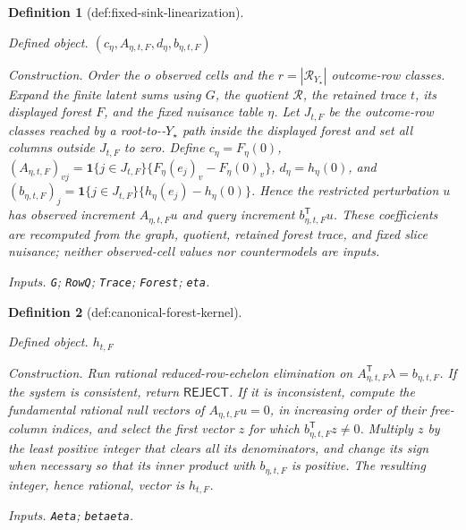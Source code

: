 \documentclass{article}
\newtheorem{definition}{Definition}
\begin{document}
\begin{definition}[def:fixed-sink-linearization]\label{def:fixed-sink-linearization}
\par\smallskip\noindent\emph{Defined object.} \((c_{\eta},A_{\eta,t,F},d_{\eta},b_{\eta,t,F})\)
\par\smallskip\noindent\emph{Construction.} Order the \(o\) observed cells and the \(r=|\mathcal R_{Y_{\star}}|\) outcome-row classes. Expand the finite latent sums using \(G\), the quotient \(\mathcal R\), the retained trace \(t\), its displayed forest \(F\), and the fixed nuisance table \(\eta\). Let \(J_{t,F}\) be the outcome-row classes reached by a root-to-‑\(Y_{\star}\) path inside the displayed forest and set all columns outside \(J_{t,F}\) to zero. Define \(c_{\eta}=F_{\eta}(0)\), \((A_{\eta,t,F})_{vj}=\mathbf 1\{j\in J_{t,F}\}\{F_{\eta}(e_j)_v-F_{\eta}(0)_v\}\), \(d_{\eta}=h_{\eta}(0)\), and \((b_{\eta,t,F})_j=\mathbf 1\{j\in J_{t,F}\}\{h_{\eta}(e_j)-h_{\eta}(0)\}\). Hence the restricted perturbation \(u\) has observed increment \(A_{\eta,t,F}u\) and query increment \(b_{\eta,t,F}^{\mathsf T}u\). These coefficients are recomputed from the graph, quotient, retained forest trace, and fixed slice nuisance; neither observed-cell values nor countermodels are inputs.
\par\smallskip\noindent\emph{Inputs.} \texttt{G}; \texttt{RowQ}; \texttt{Trace}; \texttt{Forest}; \texttt{eta}.
\end{definition}

\begin{definition}[def:canonical-forest-kernel]\label{def:canonical-forest-kernel}
\par\smallskip\noindent\emph{Defined object.} \(h_{t,F}\)
\par\smallskip\noindent\emph{Construction.} Run rational reduced-row-echelon elimination on \(A_{\eta,t,F}^{\mathsf T}\lambda=b_{\eta,t,F}\). If the system is consistent, return \(\mathsf{REJECT}\). If it is inconsistent, compute the fundamental rational null vectors of \(A_{\eta,t,F}u=0\), in increasing order of their free-column indices, and select the first vector \(z\) for which \(b_{\eta,t,F}^{\mathsf T}z\ne0\). Multiply \(z\) by the least positive integer that clears all its denominators, and change its sign when necessary so that its inner product with \(b_{\eta,t,F}\) is positive. The resulting integer, hence rational, vector is \(h_{t,F}\).
\par\smallskip\noindent\emph{Inputs.} \texttt{Aeta}; \texttt{betaeta}.
\end{definition}
\end{document}
